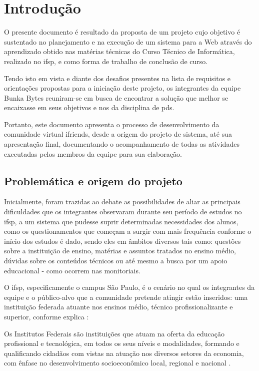 \chapter{Introdução}
O presente documento é resultado da proposta de um projeto cujo objetivo é sustentado no planejamento e na execução de um sistema para a Web através do aprendizado obtido nas matérias técnicas do Curso Técnico de Informática, realizado no \acs{ifsp}, e como forma de trabalho de conclusão de curso.

Tendo isto em vista e diante dos desafios presentes na lista de requisitos e orientações propostas para a iniciação deste projeto, os integrantes da equipe Bunka Bytes reuniram-se em busca de encontrar a solução que melhor se encaixasse em seus objetivos e nos da disciplina de \acs{pds}.

Portanto, este documento apresenta o processo de desenvolvimento da comunidade virtual \gls{ifriends}, desde a origem do projeto de sistema, até sua apresentação final, documentando o acompanhamento de todas as atividades executadas pelos membros da equipe para sua elaboração. 

\section{Problemática e origem do projeto}
Inicialmente, foram trazidas ao debate as possibilidades de aliar as principais dificuldades que os integrantes observaram durante seu período de estudos no \ac{ifsp}, a um sistema que pudesse suprir determinadas necessidades dos alunos, como os questionamentos que começam a surgir com mais frequência conforme o início dos estudos é dado, sendo eles em âmbitos diversos tais como: questões sobre a instituição de ensino, matérias e assuntos tratados no ensino médio, dúvidas sobre os conteúdos técnicos ou até mesmo a busca por um apoio educacional - como ocorrem nas monitoriais. 

O \ac{ifsp}, especificamente o campus São Paulo, é o cenário no qual os integrantes da equipe e o público-alvo que a comunidade pretende atingir estão inseridos: uma instituição federada atuante nos ensinos médio, técnico profissionalizante e superior, conforme explica : 

\begin{citacao}
Os Institutos Federais são instituições que atuam na oferta da educação profissional e tecnológica, em todos os seus níveis e modalidades, formando e qualificando cidadãos com vistas na atuação nos diversos setores da economia, com ênfase no desenvolvimento socioeconômico local, regional e nacional \cite{ifsmg}.
\end{citacao}

